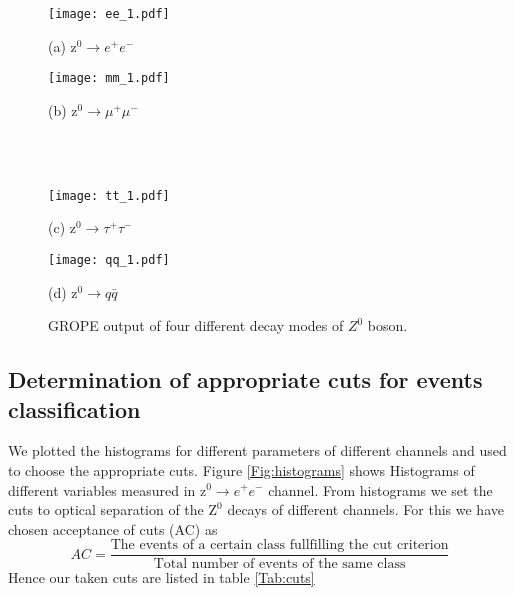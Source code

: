 \begin{figure}[H]   
	\begin{minipage}[t]{0.5\textwidth}
		\texttt{[image: ee\_1.pdf]}
		\begin{center}
			{(a) $  \text{z}^0\rightarrow e^+e^- $}
		\end{center}
	\end{minipage} \quad
	\begin{minipage}[t]{0.5\textwidth}
		\texttt{[image: mm\_1.pdf]}
		\begin{center}
			{(b) $ \text{z}^0\rightarrow \mu^+\mu^- $}
		\end{center}
	\end{minipage}\\\\
	
	
	\begin{minipage}[t]{0.5\textwidth}
		\texttt{[image: tt\_1.pdf]}
		\begin{center}
			{(c) $ \text{z}^0\rightarrow \tau^+\tau^- $}
		\end{center}
	\end{minipage} \quad
\begin{minipage}[t]{0.5\textwidth}
		\texttt{[image: qq\_1.pdf]}
		\begin{center}
			{(d) $ \text{z}^0\rightarrow q \bar{q}$}
		\end{center}
	\end{minipage}
\caption{ GROPE output of four different decay modes of $ Z^0 $ boson.}
\label{fig:eventsDisplay}	
\end{figure}

\subsection{Determination of appropriate cuts for events classification}
We plotted the histograms for different parameters of different channels and used to choose the appropriate cuts. Figure \ref{Fig:histograms} shows Histograms of different variables measured in $  \text{z}^0\rightarrow e^+e^- $ channel. From histograms we set the cuts to optical separation of the $ \text{Z}^0 $ decays of different channels. For this we have chosen acceptance of cuts (AC) as
\begin{equation}
AC= \frac{\text{The events of a certain class fullfilling the cut criterion}}{\text{Total number of events of the same class}}
\end{equation}
Hence our taken cuts are listed in table \ref{Tab:cuts}

